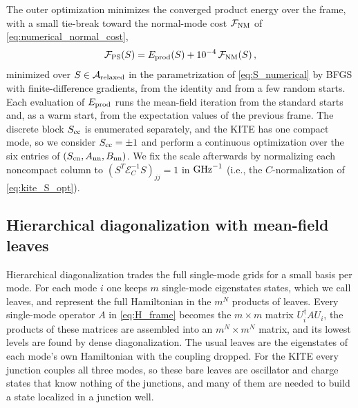 The outer optimization minimizes the converged product energy over the frame, with a small tie-break toward the normal-mode cost $\mathcal{F}_{\rm NM}$ of \cref{eq:numerical_normal_cost},
\begin{align}
    \mathcal{F}_{\rm PS}(S)=E_{\rm prod}(S)+10^{-4}\,\mathcal{F}_{\rm NM}(S)\, ,
    \label{eq:product_cost}
\end{align}
minimized over $S\in\mathcal A_{\rm relaxed}$ in the parametrization of \cref{eq:S_numerical} by BFGS with finite-difference gradients, from the identity and from a few random starts.
Each evaluation of $E_{\rm prod}$ runs the mean-field iteration from the standard starts and, as a warm start, from the expectation values of the previous frame.
The discrete block $S_{\rm cc}$ is enumerated separately, and the KITE has one compact mode, so we consider $S_{\rm cc}=\pm1$ and perform a continuous optimization over the six entries of $(S_{\rm cn},A_{\rm nn},B_{\rm nn})$.
We fix the scale afterwards by normalizing each noncompact column to $(S^T\mathcal E_C^{-1}S)_{jj}=1$ in ${\rm GHz}^{-1}$ (i.e., the $C$-normalization of \cref{eq:kite_S_opt}).

\subsection{Hierarchical diagonalization with mean-field leaves}

Hierarchical diagonalization trades the full single-mode grids for a small basis per mode.
For each mode $i$ one keeps $m$ single-mode eigenstates states, which we call leaves, and represent the full Hamiltonian in the $m^N$ products of leaves.
Every single-mode operator $A$ in \cref{eq:H_frame} becomes the $m\times m$ matrix $U_i^\dagger AU_i$, the products of these matrices are assembled into an $m^N\times m^N$ matrix, and its lowest levels are found by dense diagonalization.
The usual leaves are the eigenstates of each mode's own Hamiltonian with the coupling dropped.
For the KITE every junction couples all three modes, so these bare leaves are oscillator and charge states that know nothing of the junctions, and many of them are needed to build a state localized in a junction well.


